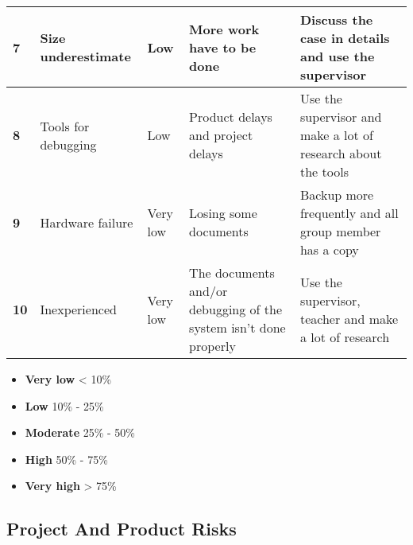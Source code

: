 \begin{center}
\begin{tabular}{ | l | p{4cm} | l | p{4cm} | p{4cm} |}
		\textbf{7} & Size underestimate & Low & More work have to be done & Discuss the case in details and use the supervisor \\ \hline
		
		\textbf{8} & Tools for debugging & Low & Product delays and project delays & Use the supervisor and make a lot of research about the tools \\ \hline
		
		\textbf{9} & Hardware failure & Very low & Losing some documents & Backup more frequently and all group member has a copy \\ \hline
		
		\textbf{10} & Inexperienced & Very low & The documents and/or debugging of the system isn’t done properly & Use the supervisor, teacher and make a lot of research \\
		
      \hline
    \end{tabular}
\end{center}

{\renewcommand\labelitemi{}
\begin{itemize} \textbf{Probability:}\\
	\item \textbf{Very low} < 10\% \\
	\item \textbf{Low} 10\% - 25\% \\
	\item \textbf{Moderate} 25\% - 50\% \\
	\item \textbf{High} 50\% - 75\% \\
	\item \textbf{Very high} > 75\% \\
\end{itemize}
}

\subsection*{Project And Product Risks}


